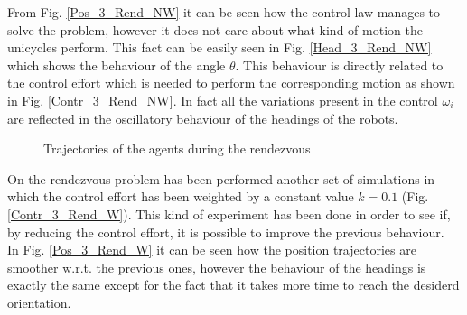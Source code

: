 \documentclass[11pt]{article}
\begin{document}
From Fig. \ref{Pos_3_Rend_NW} it can be seen how the control law manages to solve the problem, however it does not care about what kind of motion the unicycles perform. This fact can be easily seen in Fig. \ref{Head_3_Rend_NW} which shows the behaviour of the angle $\theta$. This behaviour is directly related to the control effort which is needed to perform the corresponding motion as shown in Fig. \ref{Contr_3_Rend_NW}. In fact all the variations present in the control $\omega_i$ are reflected in the oscillatory behaviour of the headings of the robots.

\begin{figure}[H]
\centering
{} \quad
{} 
\caption{Trajectories of the agents during the rendezvous }
\label{fig: 3_Rend_NW}
\end{figure}

On the rendezvous problem has been performed another set of simulations in which the control effort has been weighted by a constant value $k = 0.1$ (Fig. \ref{Contr_3_Rend_W}). This kind of experiment has been done in order to see if, by reducing the control effort, it is possible to improve the previous behaviour. \\
In Fig. \ref{Pos_3_Rend_W} it can be seen how the position trajectories are smoother w.r.t. the previous ones, however the behaviour of the headings is exactly the same except for the fact that it takes more time to reach the desiderd orientation.
\end{document}
